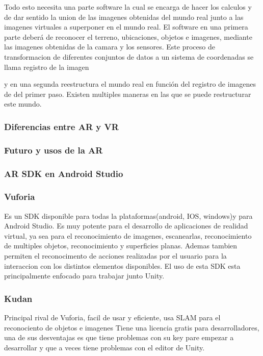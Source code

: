 Todo esto necesita una parte software la cual se encarga de hacer los calculos y de dar sentido la union de las imagenes obtenidas del mundo real junto a las imagenes virtuales a superponer en el mundo real.
 El software en una primera parte deberá de reconocer el terreno, ubicaciones, objetos e imagenes, mediante las imagenes obtenidas de la camara y los sensores. Este proceso de transformacion de diferentes conjuntos de datos a un sistema de coordenadas se llama registro de la imagen

y en una segunda reestructura el mundo real en función del registro de imagenes\cite{URL::ImageRegister} de del primer paso. Existen multiples maneras en las que se puede restructurar este mundo. 


\subsubsection{Diferencias entre AR y VR}
\subsubsection{Futuro y usos de la AR}
\subsubsection{AR SDK en Android Studio}

\subsubsection{Vuforia}

Es un SDK disponible para todas la plataformas(android, IOS, windows)y para Android Studio. Es muy potente para el desarrollo de aplicaciones de
realidad virtual, ya sea para el reconocimiento de imagenes, escanearlas, reconocimiento de multiples objetos, reconocimiento
y superficies planas. Ademas tambien permiten el reconocimento de acciones realizadas por el usuario para la interaccion con
los distintos elementos disponibles. El uso de esta SDK esta principalmente enfocado para trabajar junto Unity.


\subsubsection{Kudan}
Principal rival de Vuforia, facil de usar y eficiente, usa SLAM para el reconociento de objetos e imagenes
Tiene una licencia gratis para desarrolladores, una de sus desventajas es que tiene problemas con su key pare empezar a desarrollar y que a
veces tiene problemas con el editor de Unity.


